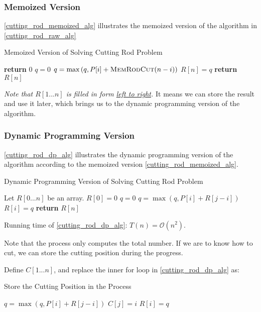 \subsubsection{Memoized Version}
\cref{cutting_rod_memoized_alg} illustrates the memoized version of the algorithm in \cref{cutting_rod_raw_alg}
\begin{algorithm}[H]
\caption{Memoized Version of Solving Cutting Rod Problem}\label{cutting_rod_memoized_alg}
\begin{algorithmic}[1]
 
    \State \textbf{return} {$0$}
\EndIf
{}
    \State $q=0$
        \State $q = \max\left(q, P[i]+\textsc{MemRodCut}(n-i)\right)$
    \EndFor
    \State $R[n] = q$
\EndIf
\State \textbf{return} {$R[n]$}
\EndProcedure
\end{algorithmic}
\end{algorithm}

\emph{Note that $R[1...n]$ is filled in form \underline{left to right}.} It means we can store the result and use it later, which brings us to the dynamic programming version of the algorithm.

\subsubsection{Dynamic Programming Version}
\cref{cutting_rod_dp_alg} illustrates the dynamic programming version of the algorithm according to the memoized version \cref{cutting_rod_memoized_alg}.
\begin{algorithm}[H]
\caption{Dynamic Programming Version of Solving Cutting Rod Problem}\label{cutting_rod_dp_alg}
\begin{algorithmic}[1]
\State Let $R[0...n]$ be an array.
\State $R[0] = 0$
    \State $q = 0$
        \State $q = \max(q, P[i] + R[j-i])$
    \EndFor
    \State $R[i] = q$
\EndFor
\State \textbf{return} {$R[n]$}
\EndProcedure
\end{algorithmic}
\end{algorithm}

Running time of \cref{cutting_rod_dp_alg}: $T(n) = \mathcal{O}(n^2)$.

Note that the process only computes the total number. If we are to know how to cut, we can store the cutting position during the progress.

Define $C[1...n]$, and replace the inner for loop in \cref{cutting_rod_dp_alg} as:
\begin{algorithm}[H]
\caption{Store the Cutting Position in the Process}
\begin{algorithmic}[1]
    \State $q = \max(q, P[i] + R[j-i])$
    \State $C[j] = i$
\EndFor
\State $R[i] = q$
\end{algorithmic}
\end{algorithm}

